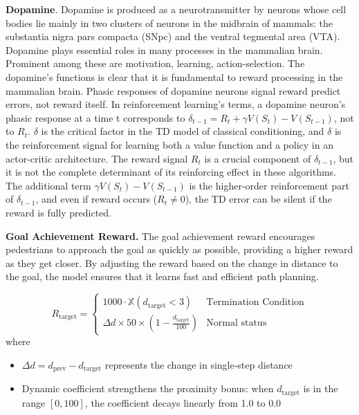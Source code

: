 \documentclass[lettersize,journal]{IEEEtran}
\begin{document}
\textbf{Dopamine}.
Dopamine is produced as a neurotransmitter by neurons whose cell bodies lie mainly in two clusters of neurons in the midbrain of mammals: the substantia nigra pars compacta (SNpc) and the ventral tegmental area (VTA). 
Dopamine plays essential roles in many processes in the mammalian brain. 
Prominent among these are motivation, learning, action-selection.
%
The dopamine's functions is clear that it is fundamental to reward processing in the mammalian brain.
%
Phasic responses of dopamine neurons signal reward predict errors, not reward itself. 
In reinforcement learning's terms, a dopamine neuron's phasic response at a time t corresponds to $\delta_{t-1} = R_t + \gamma V(S_t) - V(S_{t-1})$, not to $R_t$.
% 
$\delta$ is the critical factor in the TD model of classical conditioning, and $\delta$ is the reinforcement signal for learning both a value function and a policy in an actor-critic architecture.
%
The reward signal $R_t$ is a crucial component of $\delta_{t-1}$, but it is not the complete determinant of its reinforcing effect in these algorithms. 
The additional term $\gamma V(S_t) - V(S_{t-1})$ is the higher-order reinforcement part of $\delta_{t-1}$, and even if reward occurs ($R_t \neq 0$), the TD error can be silent if the reward is fully predicted.


\textbf{Goal Achievement Reward.}
The goal achievement reward encourages pedestrians to approach the goal as quickly as possible, providing a higher reward as they get closer. 
By adjusting the reward based on the change in distance to the goal, the model ensures that it learns fast and efficient path planning.

\begin{equation}
	R_{\text{target}} =
	\begin{cases}
		1000 \cdot \mathbb{X}(d_{\text{target}}<3) & \text{Termination Condition} \\
		\Delta d \times 50 \times \left(1 - \frac{d_{\text{target}}}{100}\right) & \text{Normal status}
	\end{cases}
\end{equation}
where 
\begin{itemize}
	\item \( \Delta d = d_{\text{prev}} - d_{\text{target}} \) represents the change in single-step distance
	\item Dynamic coefficient strengthens the proximity bonus: when \( d_{\text{target}} \) is in the range \([0, 100]\), the coefficient decays linearly from 1.0 to 0.0
\end{itemize}
\end{document}
